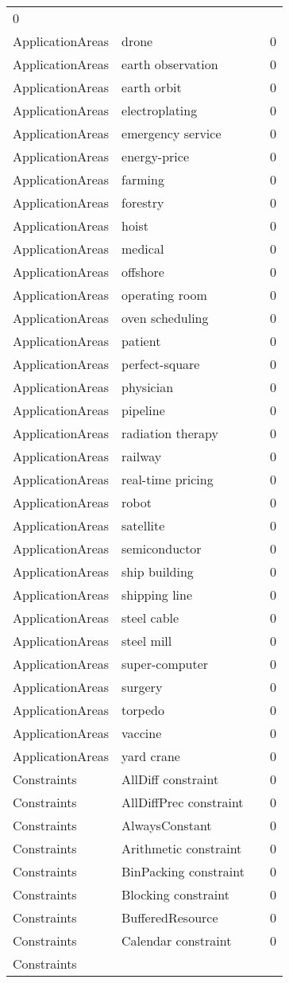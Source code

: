 {\begin{longtable}{lp{10cm}rr}
0\\ApplicationAreas & drone &  & 0\\ApplicationAreas & earth observation &  & 0\\ApplicationAreas & earth orbit &  & 0\\ApplicationAreas & electroplating &  & 0\\ApplicationAreas & emergency service &  & 0\\ApplicationAreas & energy-price &  & 0\\ApplicationAreas & farming &  & 0\\ApplicationAreas & forestry &  & 0\\ApplicationAreas & hoist &  & 0\\ApplicationAreas & medical &  & 0\\ApplicationAreas & offshore &  & 0\\ApplicationAreas & operating room &  & 0\\ApplicationAreas & oven scheduling &  & 0\\ApplicationAreas & patient &  & 0\\ApplicationAreas & perfect-square &  & 0\\ApplicationAreas & physician &  & 0\\ApplicationAreas & pipeline &  & 0\\ApplicationAreas & radiation therapy &  & 0\\ApplicationAreas & railway &  & 0\\ApplicationAreas & real-time pricing &  & 0\\ApplicationAreas & robot &  & 0\\ApplicationAreas & satellite &  & 0\\ApplicationAreas & semiconductor &  & 0\\ApplicationAreas & ship building &  & 0\\ApplicationAreas & shipping line &  & 0\\ApplicationAreas & steel cable &  & 0\\ApplicationAreas & steel mill &  & 0\\ApplicationAreas & super-computer &  & 0\\ApplicationAreas & surgery &  & 0\\ApplicationAreas & torpedo &  & 0\\ApplicationAreas & vaccine &  & 0\\ApplicationAreas & yard crane &  & 0\\Constraints & AllDiff constraint &  & 0\\Constraints & AllDiffPrec constraint &  & 0\\Constraints & AlwaysConstant &  & 0\\Constraints & Arithmetic constraint &  & 0\\Constraints & BinPacking constraint &  & 0\\Constraints & Blocking constraint &  & 0\\Constraints & BufferedResource &  & 0\\Constraints & Calendar constraint &  & 0\\Constraints & 
\end{longtable}}

